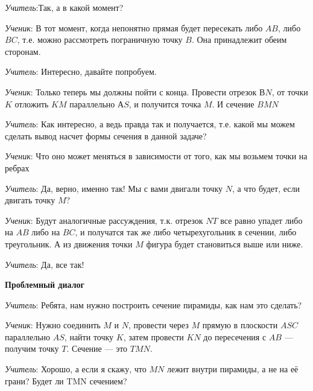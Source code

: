 \documentclass[a4paper,14pt,russian]{extreport}
\begin{document}
\textit{Учитель}:Так, а в какой момент?

\textit{Ученик}: В тот момент, когда непонятно прямая будет пересекать либо $AB$, либо $BC$, т.е. можно рассмотреть пограничную точку $B$. Она принадлежит обеим сторонам.

\textit{Учитель}: Интересно, давайте попробуем.

\textit{Ученик}: Только теперь мы должны пойти с конца. Провести отрезок $ВN$, от точки $K$ отложить $KM$ параллельно $АS$, и получится точка $M$. И сечение $BMN$

\begin{center}
    \begin{minipage}{\textwidth}
        \centering
    \end{minipage}
\end{center}

\textit{Учитель}: Как интересно, а ведь правда так и получается, т.е. какой мы можем сделать вывод насчет формы сечения в данной задаче?

\textit{Ученик}: Что оно может меняться в зависимости от того, как мы возьмем точки на ребрах

\textit{Учитель}: Да, верно, именно так! Мы с вами двигали точку $N$, а что будет, если двигать точку $M$?

\textit{Ученик}: Будут аналогичные рассуждения, т.к. отрезок $NT$ все равно упадет либо на $AB$ либо на $BC$, и получатся так же либо четырехугольник в сечении, либо треугольник. А из движения точки $M$ фигура будет становиться выше или ниже.

\textit{Учитель}: Да, все так!

\begin{center}
    \textbf{Проблемный диалог}
\end{center}



\textit{Учитель}: Ребята, нам нужно построить сечение пирамиды, как нам это сделать?

\textit{Ученик}: Нужно соединить $M$ и $N$, провести через $M$ прямую в плоскости $ASC$ параллельно $AS$, найти точку $K$, затем провести $KN$ до пересечения с $AB$ — получим точку $T$. Сечение — это $TMN$.

\textit{Учитель}: Хорошо, а если я скажу, что $MN$ лежит внутри пирамиды, а не на её грани? Будет ли TMN сечением?
\end{document}

